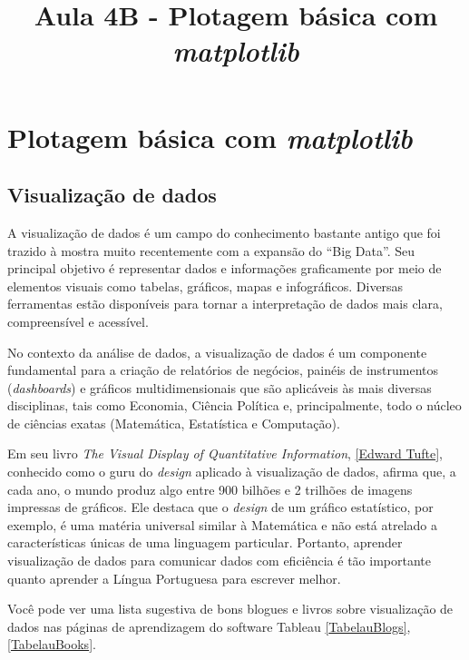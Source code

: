 \documentclass[11pt]{article}
\title{Aula 4B - Plotagem básica com \emph{matplotlib}}
\begin{document}
    
    
    \maketitle
    
    

    
    \hypertarget{plotagem-buxe1sica-com-matplotlib}{%
\section{\texorpdfstring{Plotagem básica com
\emph{matplotlib}}{Plotagem básica com matplotlib}}\label{plotagem-buxe1sica-com-matplotlib}}

    \hypertarget{visualizauxe7uxe3o-de-dados}{%
\subsection{Visualização de dados}\label{visualizauxe7uxe3o-de-dados}}

A visualização de dados é um campo do conhecimento bastante antigo que
foi trazido à mostra muito recentemente com a expansão do ``Big Data''.
Seu principal objetivo é representar dados e informações graficamente
por meio de elementos visuais como tabelas, gráficos, mapas e
infográficos. Diversas ferramentas estão disponíveis para tornar a
interpretação de dados mais clara, compreensível e acessível.

No contexto da análise de dados, a visualização de dados é um componente
fundamental para a criação de relatórios de negócios, painéis de
instrumentos (\emph{dashboards}) e gráficos multidimensionais que são
aplicáveis às mais diversas disciplinas, tais como Economia, Ciência
Política e, principalmente, todo o núcleo de ciências exatas
(Matemática, Estatística e Computação).

Em seu livro \emph{The Visual Display of Quantitative Information},
\href{https://www.edwardtufte.com/tufte/}{{[}Edward Tufte{]}}, conhecido
como o guru do \emph{design} aplicado à visualização de dados, afirma
que, a cada ano, o mundo produz algo entre 900 bilhões e 2 trilhões de
imagens impressas de gráficos. Ele destaca que o \emph{design} de um
gráfico estatístico, por exemplo, é uma matéria universal similar à
Matemática e não está atrelado a características únicas de uma linguagem
particular. Portanto, aprender visualização de dados para comunicar
dados com eficiência é tão importante quanto aprender a Língua
Portuguesa para escrever melhor.

Você pode ver uma lista sugestiva de bons blogues e livros sobre
visualização de dados nas páginas de aprendizagem do software Tableau
\href{https://www.tableau.com/learn/articles/best-data-visualization-blogs}{{[}TabelauBlogs{]}},
\href{https://www.tableau.com/learn/articles/books-about-data-visualization}{{[}TabelauBooks{]}}.
\end{document}
